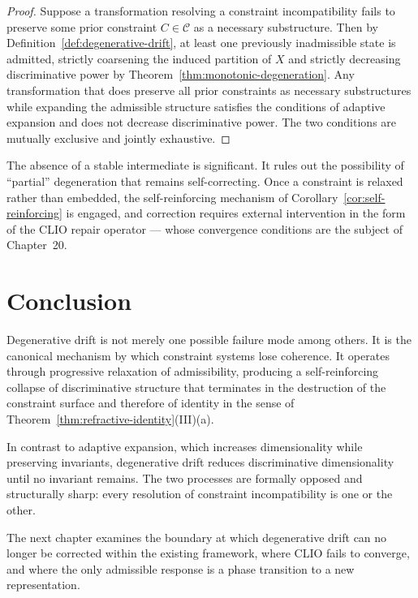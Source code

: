\documentclass[11pt,openany]{book}
\begin{document}
\begin{proof}
Suppose a transformation resolving a constraint
incompatibility fails to preserve some prior constraint
$C \in \mathcal{C}$ as a necessary substructure.  Then by
Definition~\ref{def:degenerative-drift}, at least one
previously inadmissible state is admitted, strictly
coarsening the induced partition of $X$ and strictly
decreasing discriminative power by
Theorem~\ref{thm:monotonic-degeneration}.  Any
transformation that does preserve all prior constraints as
necessary substructures while expanding the admissible
structure satisfies the conditions of adaptive expansion
and does not decrease discriminative power.  The two
conditions are mutually exclusive and jointly exhaustive.
\end{proof}

\begin{remark}
The absence of a stable intermediate is significant.
It rules out the possibility of ``partial'' degeneration
that remains self-correcting.  Once a constraint is
relaxed rather than embedded, the self-reinforcing
mechanism of Corollary~\ref{cor:self-reinforcing} is
engaged, and correction requires external intervention in
the form of the CLIO repair operator --- whose convergence
conditions are the subject of Chapter~20.
\end{remark}

\section{Conclusion}
\label{sec:conclusion-drift}

Degenerative drift is not merely one possible failure mode
among others.  It is the canonical mechanism by which
constraint systems lose coherence.  It operates through
progressive relaxation of admissibility, producing a
self-reinforcing collapse of discriminative structure that
terminates in the destruction of the constraint surface and
therefore of identity in the sense of
Theorem~\ref{thm:refractive-identity}(III)(a).

In contrast to adaptive expansion, which increases
dimensionality while preserving invariants, degenerative
drift reduces discriminative dimensionality until no
invariant remains.  The two processes are formally opposed
and structurally sharp: every resolution of constraint
incompatibility is one or the other.

The next chapter examines the boundary at which degenerative
drift can no longer be corrected within the existing
framework, where CLIO fails to converge, and where the only
admissible response is a phase transition to a new
representation.
\end{document}
